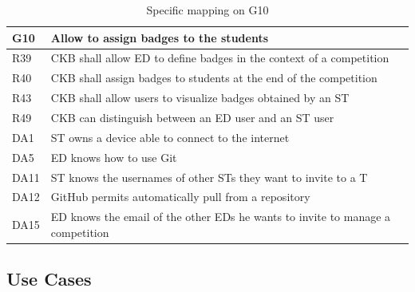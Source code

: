   \begin{table}[H]
    \begin{longtable}{|l|p{12cm}|}
      \hline
      \textbf{G10} & \textbf{Allow to assign badges to the students}      \\
      \hline
      R39 & CKB shall allow ED to define badges in the context of a competition \\
      \hline
      R40 & CKB shall assign badges to students at the end of the competition \\
      \hline
      R43 & CKB shall allow users to visualize badges obtained by an ST \\
      \hline
      R49 & CKB can distinguish between an ED user and an ST user \\
      \hline
      DA1 & ST owns a device able to connect to the internet \\
      \hline
      DA5 & ED knows how to use Git \\
      \hline
      DA11 & ST knows the usernames of other STs they want to invite to a T \\
      \hline
      DA12 & GitHub permits automatically pull from a repository \\
      \hline
      DA15 & ED knows the email of the other EDs he wants to invite to manage a competition \\
      \hline
    \end{longtable}
    \caption{Specific mapping on G10}
    \label{tab:mappingG10}
  \end{table}

\pagebreak

\subsection{Use Cases}
\label{ss:Use_cases}%

